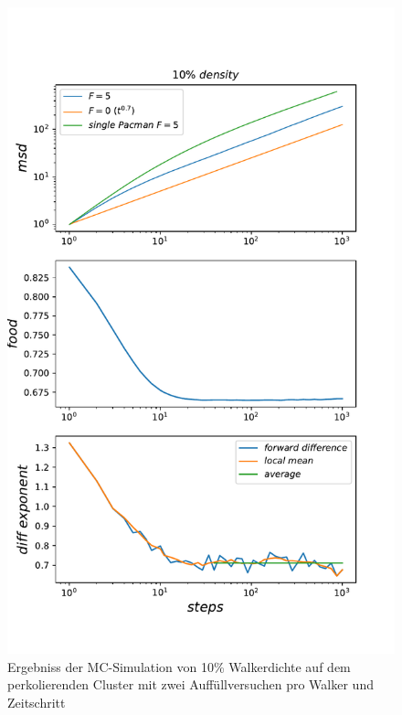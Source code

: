 \documentclass[a4paper, 12pt]{report}
\begin{document}
\begin{figure}[H]
	\centering
	\includegraphics[scale=0.75]{10percent_new_2food.pdf}
	\caption{Ergebniss der MC-Simulation von 10\% Walkerdichte auf dem perkolierenden Cluster mit zwei Auffüllversuchen pro Walker und Zeitschritt}
\end{figure}

\clearpage
\end{document}
